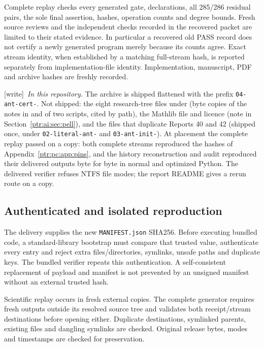 \documentclass[11pt,letterpaper]{article}
\theoremstyle{definition}\newtheorem{definition}[theorem]{Definition}
\theoremstyle{remark}\newtheorem{remark}[theorem]{Remark}
\newcommand{\codeu}[1]{\nolinkurl{#1}}
\newcommand{\wtag}{\textup{[write]}}
\begin{document}
Complete replay checks every generated gate, declarations, all 285/286 residual pairs, the sole final assertion, hashes, operation counts and degree bounds. Fresh source reviews and the independent checks recorded in the recovered packet are limited to their stated evidence. In particular a recovered old PASS record does not certify a newly generated program merely because its counts agree. Exact stream identity, when established by a matching full-stream hash, is reported separately from implementation-file identity. Implementation, manuscript, PDF and archive hashes are freshly recorded.

{\small\wtag\ \emph{In this repository.} The archive is shipped flattened
with the prefix \texttt{04-ant-cert-}. Not shipped: the eight research-tree
files under  (byte copies of the notes in
 and of two
 scripts, cited by path), the Mathlib
file and licence (note in Section~\ref{ptr:ai:sec:pell}), and the files that
duplicate Reports 40 and 42 (shipped once, under \texttt{02-literal-ant-} and
\texttt{03-ant-init-}). At placement the complete replay passed on a copy:
both complete streams reproduced the hashes of Appendix~\ref{ptr:pc:app:pins},
and the history reconstruction and audit reproduced their delivered outputs
byte for byte in normal and optimized Python. The delivered verifier refuses
NTFS file modes; the report README gives a rerun route on a copy.\par}

\subsection{Authenticated and isolated reproduction}
The delivery supplies the new \codeu{MANIFEST.json} SHA256. Before executing bundled code, a standard-library bootstrap must compare that trusted value, authenticate every entry and reject extra files/directories, symlinks, unsafe paths and duplicate keys. The bundled verifier repeats this authentication. A self-consistent replacement of payload and manifest is not prevented by an unsigned manifest without an external trusted hash.

Scientific replay occurs in fresh external copies. The complete generator requires fresh outputs outside its resolved source tree and validates both receipt/stream destinations before opening either. Duplicate destinations, symlinked parents, existing files and dangling symlinks are checked. Original release bytes, modes and timestamps are checked for preservation.
\end{document}
